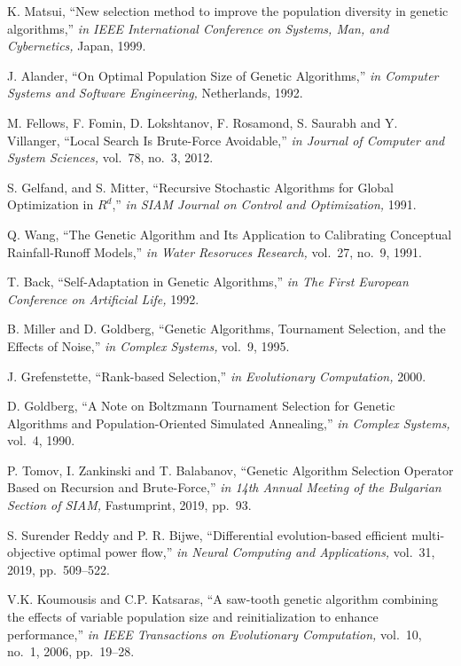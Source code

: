 \documentclass{svproc}
\begin{document}
\begin{thebibliography}{6}
 K. Matsui, ``New selection method to improve the population diversity in genetic algorithms,'' {\it in IEEE International Conference on Systems, Man, and Cybernetics,} Japan, 1999.

 J. Alander, ``On Optimal Population Size of Genetic Algorithms,'' {\it in Computer Systems and Software Engineering,} Netherlands, 1992.

 M. Fellows, F. Fomin, D. Lokshtanov, F. Rosamond, S. Saurabh and Y. Villanger, ``Local Search Is Brute-Force Avoidable,'' {\it in Journal of Computer and System Sciences,} vol.~78, no.~3, 2012.

 S. Gelfand, and S. Mitter, ``Recursive Stochastic Algorithms for Global Optimization in $R^d$,'' {\it in SIAM Journal on Control and Optimization,} 1991.

 Q. Wang, ``The Genetic Algorithm and Its Application to Calibrating Conceptual Rainfall‐Runoff Models,'' {\it in Water Resoruces Research,} vol.~27, no.~9, 1991.

 T. Back, ``Self-Adaptation in Genetic Algorithms,'' {\it in The First European Conference on Artificial Life,} 1992.

 B. Miller and D. Goldberg, ``Genetic Algorithms, Tournament Selection, and the Effects of Noise,'' {\it in Complex Systems,} vol.~9, 1995.

 J. Grefenstette, ``Rank-based Selection,'' {\it in Evolutionary Computation,} 2000.

 D. Goldberg, ``A Note on Boltzmann Tournament Selection for Genetic Algorithms and Population-Oriented Simulated Annealing,'' {\it in Complex Systems,} vol.~4, 1990.

 P. Tomov, I. Zankinski and T. Balabanov, ``Genetic Algorithm Selection Operator Based on Recursion and Brute-Force,'' {\it in 14th Annual Meeting of the Bulgarian Section of SIAM,} Fastumprint, 2019, pp.~93.

 S. Surender Reddy and P. R. Bijwe, ``Differential evolution-based efficient multi-objective optimal power flow,'' {\it in Neural Computing and Applications,} vol.~31, 2019, pp.~509--522.

 V.K. Koumousis and C.P. Katsaras, ``A saw-tooth genetic algorithm combining the effects of variable population size and reinitialization to enhance performance,'' {\it in IEEE Transactions on Evolutionary Computation,} vol.~10, no.~1, 2006, pp.~19--28.
\end{thebibliography}
\end{document}
